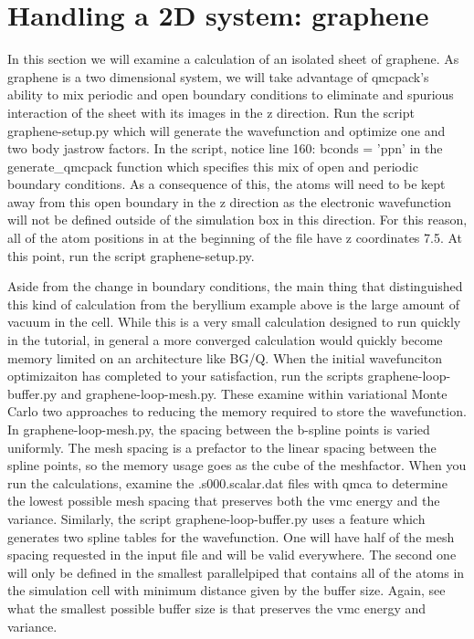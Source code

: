 \section{Handling a 2D system: graphene}
In this section we will examine a calculation of an isolated sheet of graphene.  As graphene is a two dimensional system, we will take advantage of qmcpack's ability to mix periodic and open boundary conditions to eliminate and spurious interaction of the sheet with its images in the z direction.  Run the script graphene-setup.py which will generate the wavefunction and optimize one and two body jastrow factors.  In the script, notice line 160: bconds = 'ppn' in the generate\_qmcpack function which specifies this mix of open and periodic boundary conditions.  As a consequence of this, the atoms will need to be kept away from this open boundary in the z direction as the electronic wavefunction will not be defined outside of the simulation box in this direction.  For this reason, all of the atom positions in at the beginning of the file have z coordinates 7.5.  At this point, run the script graphene-setup.py.

Aside from the change in boundary conditions, the main thing that distinguished this kind of calculation from the beryllium example above is the large amount of vacuum in the cell.  While this is a very small calculation designed to run quickly in the tutorial, in general a more converged calculation would quickly become memory limited on an architecture like BG/Q.  When the initial wavefunciton optimizaiton has completed to your satisfaction, run the scripts graphene-loop-buffer.py and graphene-loop-mesh.py.  These examine within variational Monte Carlo two approaches to reducing the memory required to store the wavefunction.  In graphene-loop-mesh.py, the spacing between the b-spline points is varied uniformly.  The mesh spacing is a prefactor to the linear spacing between the spline points, so the memory usage goes as the cube of the meshfactor.  When you run the calculations, examine the .s000.scalar.dat files with qmca to determine the lowest possible mesh spacing that preserves both the vmc energy and the variance.  Similarly, the script graphene-loop-buffer.py uses a feature which generates two spline tables for the wavefunction.  One will have half of the mesh spacing requested in the input file and will be valid everywhere.  The second one will only be defined in the smallest parallelpiped that contains all of the atoms in the simulation cell with minimum distance given by the buffer size.  Again, see what the smallest possible buffer size is that preserves the vmc energy and variance.

